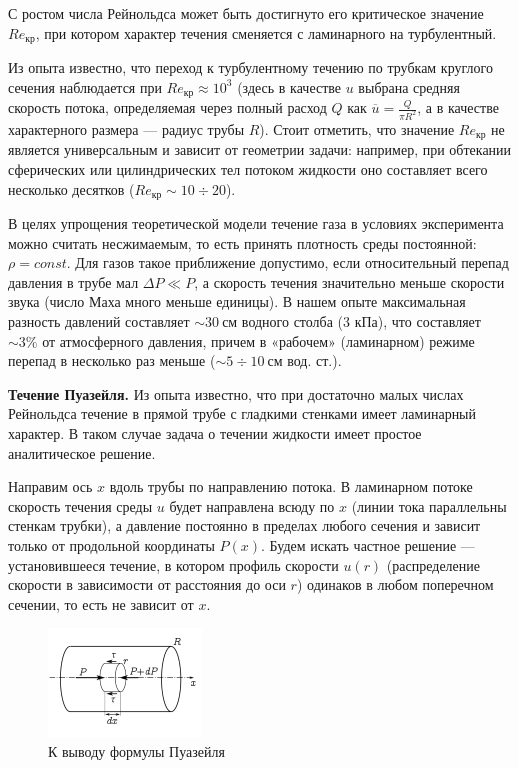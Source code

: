 \documentclass[a4paper, 12pt]{article}
\begin{document}
С ростом числа Рейнольдса может быть достигнуто его критическое значение $Re_{\text{кр}}$, при котором характер течения сменяется с ламинарного на турбулентный.
\par Из опыта известно, что переход к турбулентному течению по трубкам
круглого сечения наблюдается при $Re_{\text{кр}} \approx 10^3$ (здесь в качестве $u$ выбрана средняя скорость потока, определяемая через полный расход $Q$ как $\overline{u}=\frac{Q}{\pi{R^2}}$, а в качестве характерного размера — радиус трубы $R$). Стоит отметить, что значение $Re_{\text{кр}}$ не является универсальным и зависит от геометрии задачи: например, при обтекании сферических или цилиндрических тел потоком жидкости
оно составляет всего несколько десятков ($Re_{\text{кр}} \sim 10 \div 20$).
\par В целях упрощения теоретической модели течение газа в условиях эксперимента можно считать несжимаемым, то есть принять плотность среды постоянной: $\rho = const$. Для газов такое приближение допустимо, если относительный перепад давления в трубе мал $\Delta{P} \ll P$, а скорость течения значительно меньше скорости звука (число Маха много меньше единицы). В нашем
опыте максимальная разность давлений составляет $\sim 30~\text{см}$ водного столба
(3 кПа), что составляет $\sim 3\%$ от атмосферного давления, причем в «рабочем»
(ламинарном) режиме перепад в несколько раз меньше ($\sim 5 \div 10~\text{см вод. ст.}$).
\par {\bf Течение Пуазейля.} Из опыта известно, что при достаточно малых числах
Рейнольдса течение в прямой трубе с гладкими стенками имеет ламинарный
характер. В таком случае задача о течении жидкости имеет простое аналитическое решение.
\par Направим ось $x$ вдоль трубы по направлению потока. В ламинарном потоке
скорость течения среды $u$ будет направлена всюду по $x$ (линии тока параллельны стенкам трубки), а давление постоянно в пределах любого сечения и зависит только от продольной координаты $P(x)$. Будем искать частное решение — установившееся течение, в котором профиль скорости $u(r)$ (распределение скорости в зависимости от расстояния до оси $r$) одинаков в любом поперечном сечении, то есть не зависит от $x$.
\begin{figure}
\includegraphics[scale=1.2]{1.png}
\caption{К выводу формулы Пуазейля}
\label{ris1}
\end{figure}
\end{document}
